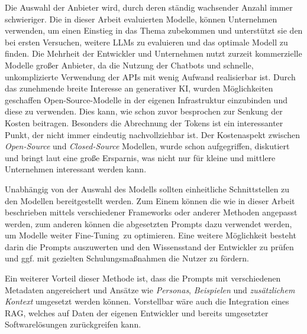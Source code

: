 Die Auswahl der Anbieter wird, durch deren ständig wachsender Anzahl immer schwieriger. Die in dieser Arbeit evaluierten Modelle, können Unternehmen verwenden, um einen Einstieg in das Thema zubekommen und unterstützt sie den bei ersten Versuchen, weitere LLMs zu evaluieren und das optimale Modell zu finden. Die Mehrheit der Entwickler und Unternehmen nutzt zurzeit kommerzielle Modelle großer Anbieter, da die Nutzung der Chatbots und schnelle, unkomplizierte Verwendung der APIs mit wenig Aufwand realisierbar ist. Durch das zunehmende breite Interesse an generativer KI, wurden Möglichkeiten geschaffen Open-Source-Modelle in der eigenen Infrastruktur einzubinden und diese zu verwenden. Dies kann, wie schon zuvor besprochen zur Senkung der Kosten beitragen. Besonders die Abrechnung der Tokens ist ein interessanter Punkt, der nicht immer eindeutig nachvollziehbar ist. Der Kostenaspekt zwischen \textit{Open-Source} und \textit{Closed-Source} Modellen, wurde schon aufgegriffen, diskutiert und bringt laut \cite{irugalbandara-2023} eine große Ersparnis, was nicht nur für kleine und mittlere Unternehmen interessant werden kann.\vspace{0.2cm}

Unabhängig von der Auswahl des Modells sollten einheitliche Schnittstellen zu den Modellen bereitgestellt werden. Zum Einem können die wie in dieser Arbeit beschrieben mittels verschiedener Frameworks oder anderer Methoden angepasst werden, zum anderen können die abgesetzten Prompts dazu verwendet werden, um Modelle weiter \glqq Fine-Tuning\grqq \ zu optimieren. Eine weitere Möglichkeit besteht darin die Prompts auszuwerten und den Wissensstand der Entwickler zu prüfen und ggf. mit gezielten Schulungsmaßnahmen die Nutzer zu fördern.\vspace{0.2cm}

Ein weiterer Vorteil dieser Methode ist, dass die Prompts mit verschiedenen Metadaten angereichert und Ansätze wie \textit{Personas}, \textit{Beispielen} und \textit{zusätzlichem Kontext} umgesetzt werden können. Vorstellbar wäre auch die Integration eines RAG, welches auf Daten der eigenen Entwickler und bereits umgesetzter Softwarelösungen zurückgreifen kann.\vspace{0.2cm}

